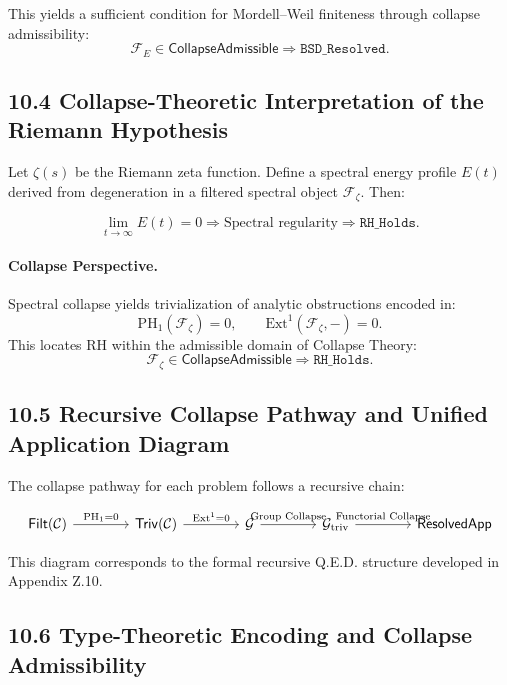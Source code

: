 \documentclass[11pt]{article}
\begin{document}
This yields a sufficient condition for Mordell–Weil finiteness through collapse admissibility:
\[
\mathcal{F}_E \in \mathsf{CollapseAdmissible} \Rightarrow \texttt{BSD\_Resolved}.
\]

\subsection*{10.4 Collapse-Theoretic Interpretation of the Riemann Hypothesis}

Let \( \zeta(s) \) be the Riemann zeta function. Define a spectral energy profile \( E(t) \) derived from degeneration in a filtered spectral object \( \mathcal{F}_\zeta \). Then:

\[
\lim_{t \to \infty} E(t) = 0 \Rightarrow \text{Spectral regularity} \Rightarrow \texttt{RH\_Holds}.
\]

\paragraph{Collapse Perspective.}
Spectral collapse yields trivialization of analytic obstructions encoded in:
\[
\mathrm{PH}_1(\mathcal{F}_\zeta) = 0, \qquad \mathrm{Ext}^1(\mathcal{F}_\zeta, -) = 0.
\]
This locates RH within the admissible domain of Collapse Theory:
\[
\mathcal{F}_\zeta \in \mathsf{CollapseAdmissible} \Rightarrow \texttt{RH\_Holds}.
\]

\subsection*{10.5 Recursive Collapse Pathway and Unified Application Diagram}

The collapse pathway for each problem follows a recursive chain:

\[
\begin{tikzcd}[column sep=4em]
\mathsf{Filt}(\mathcal{C}) \arrow[r, "\mathrm{PH}_1 = 0"]
& \mathsf{Triv}(\mathcal{C}) \arrow[r, "\mathrm{Ext}^1 = 0"]
& \mathcal{G} \arrow[r, "\text{Group Collapse}"]
& \mathcal{G}_{\mathrm{triv}} \arrow[r, "\text{Functorial Collapse}"]
& \mathsf{ResolvedApp}
\end{tikzcd}
\]

This diagram corresponds to the formal recursive Q.E.D. structure developed in Appendix Z.10.

\subsection*{10.6 Type-Theoretic Encoding and Collapse Admissibility}
\end{document}
